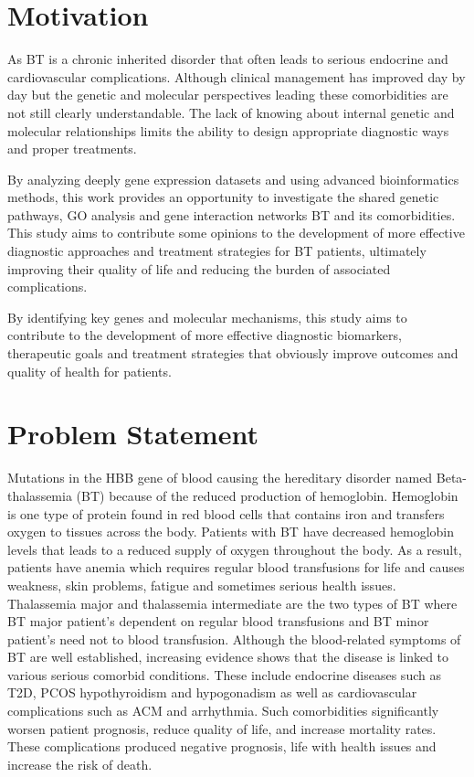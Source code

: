 \section{Motivation}
\label{sec:sec1_3}
As BT is a chronic inherited disorder that often leads to serious endocrine and cardiovascular complications. Although clinical management has improved day by day but the genetic and molecular perspectives leading these comorbidities are not still clearly understandable. The lack of knowing about internal genetic and molecular relationships limits the ability to design appropriate diagnostic ways and proper treatments.

By analyzing deeply gene expression datasets and using advanced bioinformatics methods, this work provides an opportunity to investigate the shared genetic pathways, GO analysis and gene interaction networks BT and its comorbidities. This study aims to contribute some opinions to the development of more effective diagnostic approaches and treatment strategies for BT patients, ultimately improving their quality of life and reducing the burden of associated complications.

By identifying key genes and molecular mechanisms, this study aims to contribute to the development of more effective diagnostic biomarkers, therapeutic goals and treatment strategies that obviously improve outcomes and quality of health for patients.

\section{Problem Statement}
\label{sec:sec1_4}
Mutations in the HBB gene of blood causing the hereditary disorder named Beta-thalassemia (BT) because of the reduced production of hemoglobin. Hemoglobin is one type of protein found in red blood cells that contains iron and transfers oxygen to tissues across the body. Patients with BT have decreased hemoglobin levels that leads to a reduced supply of oxygen throughout the body.  As a result, patients have anemia which requires regular blood transfusions for life and causes weakness, skin problems, fatigue and sometimes serious health issues. Thalassemia major and thalassemia intermediate are the two types of BT where BT major patient’s dependent on regular blood transfusions and BT minor patient’s need not to blood transfusion. Although the blood-related symptoms of BT are well established, increasing evidence shows that the disease is linked to various serious comorbid conditions. These include endocrine diseases such as T2D, PCOS hypothyroidism and hypogonadism as well as cardiovascular complications such as ACM and arrhythmia. Such comorbidities significantly worsen patient prognosis, reduce quality of life, and increase mortality rates. These complications produced negative prognosis, life with health issues and increase the risk of death.

